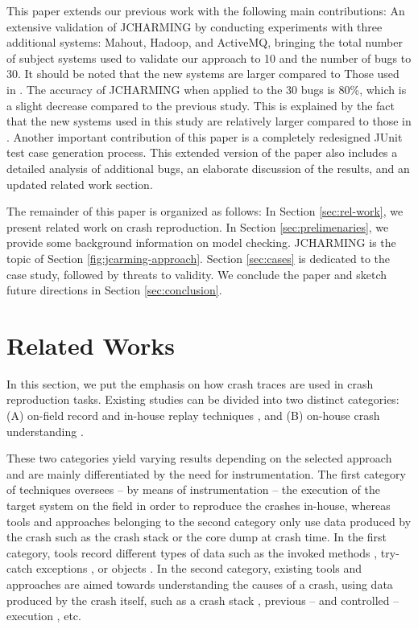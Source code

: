 \documentclass[times, doublespace]{smrauth}
\begin{document}
This paper extends our previous work \cite{Nayrolles2015} with the following main contributions:
An extensive validation of JCHARMING by conducting experiments with three
additional systems: Mahout, Hadoop, and ActiveMQ,
bringing the total number of subject systems used to
validate our approach to 10 and the number of bugs to 30.
It should be noted that the new systems are larger compared to
Those used in \cite{Nayrolles2015}.
The accuracy of JCHARMING when applied to the 30 bugs is 80\%,
which is a slight decrease compared to the previous study.
This is explained by the fact that the new systems used in
this study are relatively larger compared to those in \cite{Nayrolles2015}.
Another important contribution of this paper is a completely redesigned
JUnit test case generation process.
This extended version of the paper also includes a detailed
analysis of additional bugs, an elaborate discussion of the
results, and an updated related work section.

The remainder of this paper is organized as follows: In Section
\ref{sec:rel-work}, we present related work on crash reproduction. In Section \ref{sec:prelimenaries}, we provide some background information on model
checking. JCHARMING is the topic of Section \ref{fig:jcarming-approach}. Section \ref{sec:cases}
is dedicated to the case study, followed by threats to validity.
We conclude the paper and sketch future directions in Section
\ref{sec:conclusion}.


\section{Related Works\label{sec:rel-work}}

In this section, we put the emphasis on how crash traces are used in crash reproduction tasks.
Existing studies can be divided into two distinct categories: (A) on-field record and in-house replay techniques \cite{Steven2000,Narayanasamy2005,Artzi2008,Roehm2015}, and (B) on-house crash understanding \cite{Jin2012,Jin2013,Zuddas2014,Chen2013a,Nayrolles2015}.

These two categories yield varying results depending on the selected approach and are mainly differentiated by the need for instrumentation.
The first category of techniques oversees -- by means of instrumentation -- the execution of the target system on the field in order to reproduce the crashes in-house, whereas tools and approaches belonging to the second category only use data produced by the crash such as the crash stack or the core dump at crash time. In the first category, tools record different types of data such as the invoked methods \cite{Narayanasamy2005}, try-catch exceptions \cite{Rossler2013}, or objects \cite{Jaygarl}. In the second category, existing tools and approaches are aimed towards understanding the causes of a crash, using data produced by the crash itself, such as a crash stack \cite{Chen2013a}, previous -- and controlled -- execution \cite{Zuddas2014}, etc.
\end{document}
